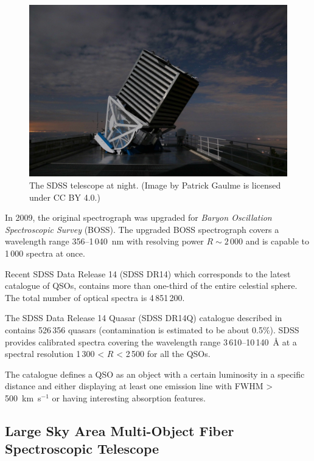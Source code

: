 \begin{figure}
\includegraphics[width=\textwidth]{img/sdss_gaulme.jpg}
\caption[The SDSS telescope]{
	The SDSS telescope at night.
	(Image by Patrick Gaulme is licensed under CC BY 4.0.)
	}
\label{sdss_telescope}
\end{figure}

In 2009, the original spectrograph was upgraded for \textit{Baryon Oscillation Spectroscopic Survey} (BOSS).
The upgraded BOSS spectrograph covers a wavelength range 356--1\,040~nm
with resolving power \(R \sim 2\,000\)
and is capable to 1\,000 spectra at once.~\cite{smee2013}

Recent SDSS Data Release 14 (SDSS DR14) which corresponds to the latest catalogue of QSOs,
contains more than one-third of the entire celestial sphere.
The total number of optical spectra is 4\,851\,200.

The SDSS Data Release 14 Quasar (SDSS DR14Q) catalogue described in~\cite{paris2018} contains 526\,356 quasars
(contamination is estimated to be about 0.5\%).
SDSS provides calibrated spectra covering the wavelength range 3\,610--10\,140~\AA{} at a spectral resolution 1\,300 < \(R\) < 2\,500 for all the QSOs.

The catalogue defines a QSO as an object with a certain luminosity in a specific distance
and either displaying at least one emission line with FWHM > 500~km~s\(^{-1}\)
or having interesting absorption features.

\subsection{Large Sky Area Multi-Object Fiber Spectroscopic Telescope}
\label{lamost}

